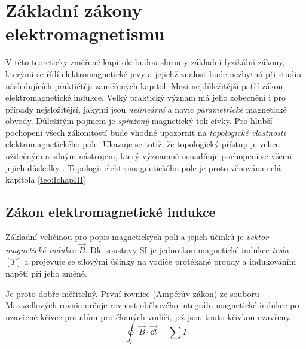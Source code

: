 \graphicspath{{../src/TEO/img/}}
\setchaptertoc
\chapter{Základní zákony elektromagnetismu}\label{teo:IchapII}
  V této teoreticky změřené kapitole budou shrnuty základní fyzikální zákony, kterými se řídí
  elektromagnetické jevy a jejichž znalost bude nezbytná při studiu následujících praktičtěji
  zaměřených kapitol. Mezi nejdůležitější patří zákon elektromagnetické indukce. Velký praktický
  význam má jeho zobecnění i pro případy nejsložitější, jakými jsou \emph{nelineární} a navíc
  \emph{parametrické} magnetické obvody. Důležitým pojmem je \emph{spřažený} magnetický tok cívky.
  Pro hlubší pochopení všech zákonitostí bude vhodné upozornit na \emph{topologické vlastnosti}
  elektromagnetického pole. Ukazuje se totiž, že topologický přístup je velice užitečným a silným
  nástrojem, který významně usnadňuje pochopení \wikiMaxwellEq se všemi jejich důsledky
  \cite[s.~6]{Patocka4}. Topologii elektromagnetického pole je proto věnována celá kapitola
  \ref{teo:IchapIII}
  
  \section{Zákon elektromagnetické indukce}\label{teo:IchapIIsecI}
    Základní veličinou pro popis magnetických polí a jejich účinků je \emph{vektor magnetické
    indukce} \(\vec{B}\). Dle soustavy SI je jednotkou magnetické indukce \emph{tesla} \([T]\) a
    projevuje se silovými účinky na vodiče protékané proudy a indukováním napětí při jeho změně.

    Je proto dobře měřitelný. První rovnice (Ampérův zákon) ze souboru Maxwellových rovnic určuje
    rovnost oběhového integrálu magnetické indukce po uzavřené křivce proudům protékaných vodiči,
    jež jsou touto křivkou uzavřeny.
    \begin{equation}\label{TEO:eq101}
      \oint_l \vec{B} \cdot \vec{\dd{l}} = \sum I
    \end{equation}
    
